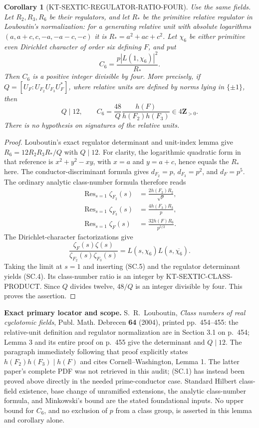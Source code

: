 \documentclass[11pt,a4paper]{article}
\newtheorem{corollary}[theorem]{Corollary}
\theoremstyle{definition}
\renewcommand{\paragraph}[1]{\par\smallskip\noindent\textbf{#1}\quad\ignorespaces}
\begin{document}
\begin{corollary}[KT-SEXTIC-REGULATOR-RATIO-FOUR]
Use the same fields.  Let $R_2,R_3,R_6$ be their regulators, and let
$R_*$ be the primitive relative regulator in Louboutin's normalization:
for a generating relative unit with absolute logarithms
$(a,a+c,c,-a,-a-c,-c)$ it is $R_*=a^2+ac+c^2$.
Let $\chi_6$ be either primitive even Dirichlet character of order six
defining $F$, and put
\[
                       C_6=\frac{p|L(1,\chi_6)|^2}{R_*}.
 \tag{SC.3}
\]
Then $C_6$ is a positive integer divisible by four.  More precisely,
if $Q=[U_F:U_{F_2}U_{F_3}U_F^*]$, where relative units are defined
by norms lying in $\{\pm1\}$, then
\[
 Q\mid12,\qquad
 C_6=\frac{48}{Q}\frac{h(F)}{h(F_2)h(F_3)}\in4\mathbf Z_{>0}.
 \tag{SC.4}
\]
There is no hypothesis on signatures of the relative units.
\end{corollary}

\begin{proof}
Louboutin's exact regulator determinant and unit-index lemma give
$R_6=12R_2R_3R_*/Q$ with $Q\mid12$.
For clarity, the logarithmic quadratic form in that reference is
$x^2+y^2-xy$, with $x=a$ and $y=a+c$, hence equals the $R_*$ here.
The conductor-discriminant formula gives
$d_{F_2}=p$, $d_{F_3}=p^2$, and $d_F=p^5$.
The ordinary analytic class-number formula therefore reads
\[
 \begin{aligned}
 \operatorname{Res}_{s=1}\zeta_{F_2}(s)&=\frac{2h(F_2)R_2}{\sqrt p},\\
 \operatorname{Res}_{s=1}\zeta_{F_3}(s)&=\frac{4h(F_3)R_3}{p},\\
 \operatorname{Res}_{s=1}\zeta_F(s)&=\frac{32h(F)R_6}{p^{5/2}}.
 \end{aligned}
 \tag{SC.5}
\]
The Dirichlet-character factorizations give
\[
 \frac{\zeta_F(s)\zeta(s)}{\zeta_{F_2}(s)\zeta_{F_3}(s)}
       =L(s,\chi_6)L(s,\overline{\chi_6}).
\]
Taking the limit at $s=1$ and inserting (SC.5) and the regulator
determinant yields (SC.4).  Its class-number ratio is an integer
by KT-SEXTIC-CLASS-PRODUCT.  Since $Q$ divides twelve, $48/Q$ is
an integer divisible by four.  This proves the assertion.
\end{proof}

\paragraph{Exact primary locator and scope.}
S.~R.~Louboutin, \emph{Class numbers of real cyclotomic fields},
Publ. Math. Debrecen \textbf{64} (2004), printed pp.~454--455:
the relative-unit definition and regulator normalization are in
Section 3.1 on p.~454; Lemma 3 and its entire proof on p.~455
give the determinant and $Q\mid12$.
The paragraph immediately following that proof explicitly states
$h(F_2)h(F_3)\mid h(F)$ and cites Cornell--Washington, Lemma 1.
The latter paper's complete PDF was not retrieved in this audit;
(SC.1) has instead been proved above directly in the needed
prime-conductor case.  Standard Hilbert class-field existence,
base change of unramified extensions, the analytic class-number
formula, and Minkowski's bound are the stated foundational inputs.
No upper bound for $C_6$, and no exclusion of $p$ from a class group,
is asserted in this lemma and corollary alone.
\end{document}
